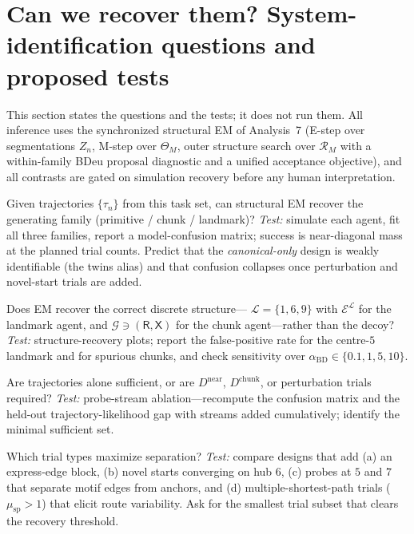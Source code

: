 \documentclass[11pt]{article}
\begin{document}
\section{Can we recover them? System-identification questions and proposed tests}
\label{sec:recover}

This section states the questions and the tests; it does not run them. All inference uses
the synchronized structural EM of Analysis~7 (E-step over segmentations $Z_n$, M-step over
$\Theta_M$, outer structure search over $\mathcal R_M$ with a within-family BDeu proposal
diagnostic and a unified acceptance objective), and all contrasts are gated on simulation
recovery before any human interpretation.

\begin{description}[leftmargin=1.6em,style=nextline]
\item[Q1. Family recovery.] Given trajectories $\{\tau_n\}$ from this task set, can
structural EM recover the generating family (primitive / chunk / landmark)?
\emph{Test:} simulate each agent, fit all three families, report a model-confusion matrix;
success is near-diagonal mass at the planned trial counts. Predict that the
\emph{canonical-only} design is weakly identifiable (the twins alias) and that confusion
collapses once perturbation and novel-start trials are added.
\item[Q2. Structure recovery.] Does EM recover the correct discrete structure---
$\mathcal L=\{1,6,9\}$ with $\mathcal E^{\mathcal L}$ for the landmark agent, and
$\mathcal G\ni(\mathsf R,\mathsf X)$ for the chunk agent---rather than the decoy?
\emph{Test:} structure-recovery plots; report the false-positive rate for the centre-$5$
landmark and for spurious chunks, and check sensitivity over
$\alpha_{\mathrm{BD}}\in\{0.1,1,5,10\}$.
\item[Q3. Which data streams are necessary.] Are trajectories alone sufficient, or are
$D^{\mathrm{near}}$, $D^{\mathrm{chunk}}$, or perturbation trials required?
\emph{Test:} probe-stream ablation---recompute the confusion matrix and the held-out
trajectory-likelihood gap with streams added cumulatively; identify the minimal sufficient
set.
\item[Q4. Task-design levers.] Which trial types maximize separation?
\emph{Test:} compare designs that add (a) an express-edge block, (b) novel starts
converging on hub $6$, (c) probes at $5$ and $7$ that separate motif edges from anchors,
and (d) multiple-shortest-path trials ($\mu_{\mathrm{sp}}>1$) that elicit route
variability. Ask for the smallest trial subset that clears the recovery threshold.

\end{description}
\end{document}
